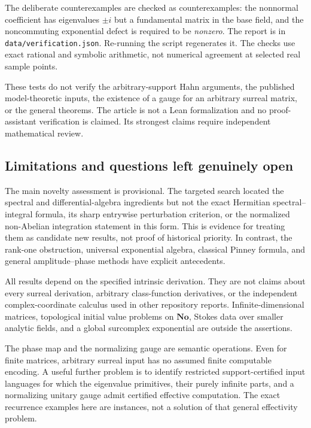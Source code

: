 \documentclass[11pt,a4paper]{article}
\numberwithin{equation}{section}
\theoremstyle{definition}
\theoremstyle{remark}
\newcommand{\No}{\mathbf{No}}
\begin{document}
The deliberate counterexamples are checked as counterexamples: the
nonnormal coefficient has eigenvalues $\pm i$ but a fundamental matrix
in the base field, and the noncommuting exponential defect is required
to be \emph{nonzero}. The report is in
\texttt{data/verification.json}. Re-running the script regenerates it.
The checks use exact rational and symbolic arithmetic, not numerical
agreement at selected real sample points.

These tests do not verify the arbitrary-support Hahn arguments, the
published model-theoretic inputs, the existence of a gauge for an
arbitrary surreal matrix, or the general theorems. The article is not a
Lean formalization and no proof-assistant verification is claimed.
Its strongest claims require independent mathematical review.

\subsection{Limitations and questions left genuinely open}
The main novelty assessment is provisional. The targeted search located
the spectral and differential-algebra ingredients but not the exact
Hermitian spectral--integral formula, its sharp entrywise perturbation
criterion, or the normalized non-Abelian integration statement in this
form. This is evidence for treating them as candidate new results, not
proof of historical priority. In contrast, the rank-one obstruction,
universal exponential algebra, classical Pinney formula, and general
amplitude--phase methods have explicit antecedents.

All results depend on the specified intrinsic derivation. They are not
claims about every surreal derivation, arbitrary class-function
derivatives, or the independent complex-coordinate calculus used in other
repository reports. Infinite-dimensional matrices, topological initial
value problems on $\No$, Stokes data over smaller analytic fields, and a
global surcomplex exponential are outside the assertions.

The phase map and the normalizing gauge are semantic operations. Even
for finite matrices, arbitrary surreal input has no assumed finite
computable encoding. A useful further problem is to identify restricted
support-certified input languages for which the eigenvalue primitives,
their purely infinite parts, and a normalizing unitary gauge admit
certified effective computation. The exact recurrence examples here are
instances, not a solution of that general effectivity problem.
\end{document}
